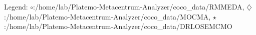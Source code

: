 Legend: {\color{CornflowerBlue}$\circ$}:/home/lab/Platemo-Metacentrum-Analyzer/coco\_data/RMMEDA, {{}$\diamondsuit$}:/home/lab/Platemo-Metacentrum-Analyzer/coco\_data/MOCMA, {\color{Green}$\star$}:/home/lab/Platemo-Metacentrum-Analyzer/coco\_data/DRLOSEMCMO